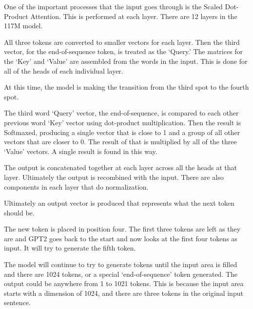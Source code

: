 One of the important processes that the input goes through is the Scaled Dot-Product Attention. This is performed at each layer. There are 12 layers in the 117M model.

All three tokens are converted to smaller vectors for each layer. Then the third vector, for the end-of-sequence token, is treated as the `Query.' The matrices for the `Key' and `Value' are assembled from the words in the input. This is done for all of the heads of each individual layer.

At this time, the model is making the transition from the third spot to the fourth spot.

The third word `Query' vector, the end-of-sequence, is compared to each other previous word `Key' vector using dot-product multiplication. Then the result is Softmaxed, producing a single vector that is close to 1 and a group of all other vectors that are closer to 0. The result of that is multiplied by all of the three `Value' vectors. A single result is found in this way.

The output is concatenated together at each layer across all the heads at that layer. Ultimately the output is recombined with the input. There are also components in each layer that do normalization.

Ultimately an output vector is produced that represents what the next token should be. %


The new token is placed in position four. The first three tokens are left as they are and GPT2 goes back to the start and now looks at the first four tokens as input. It will try to generate the fifth token.

The model will continue to try to generate tokens until the input area is filled and there are 1024 tokens, or a special `end-of-sequence' token generated. The output could be anywhere from 1 to 1021 tokens. This is because the input area starts with a dimension of 1024, and there are three tokens in the original input sentence.


